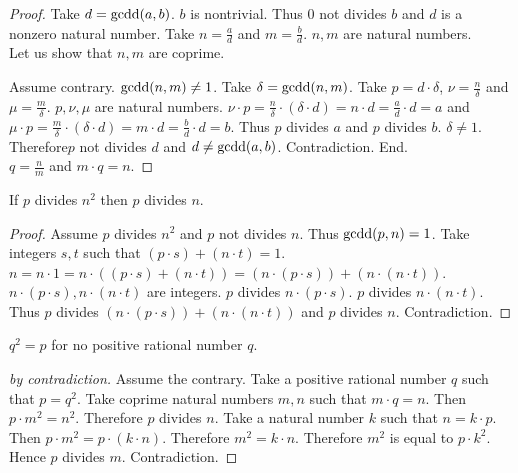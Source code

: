 \documentclass{article}
\begin{document}
\begin{forthel}
\begin{proof}
Take $d = \text{gcdd}(a,b)$. $b$ is nontrivial. Thus 0 not divides $b$ and $d$ is a nonzero natural number. 
Take $n = \frac{a}{d}$ and $m = \frac{b}{d}$. $n,m$ are natural numbers.\\

Let us show that $n,m$ are coprime. 

  Assume contrary. $\text{gcdd}(n,m) \neq 1$. Take $\delta = \text{gcdd}(n,m)$.
  Take $p = d \cdot \delta$, $\nu = \frac{n}{\delta}$ and $\mu = \frac{m}{\delta}$. $p,\nu,\mu$ are natural numbers.
  $\nu \cdot p = \frac{n}{\delta} \cdot (\delta \cdot d) = n \cdot d = \frac{a}{d} \cdot d = a$ and
  $\mu \cdot p = \frac{m}{\delta} \cdot (\delta \cdot d) = m \cdot d = \frac{b}{d} \cdot d = b$. 
  Thus $p$ divides $a$ and $p$ divides $b$. $\delta \neq 1$.
  Therefore$p$ not divides $d$ and $d \neq \text{gcdd}(a,b)$. Contradiction.
End.\\

$q = \frac{n}{m}$ and $m \cdot q = n$.
\end{proof}

    \begin{lemma}
      If $p$ divides $n^{2}$ then $p$ divides $n$. 
    \end{lemma}
    \begin{proof}
      Assume $p$ divides $n^{2}$ and $p$ not divides $n$. Thus $\text{gcdd}(p,n) = 1$.
      Take integers $s,t$ such that $(p \cdot s) + (n \cdot t) = 1$.
      $n = n \cdot 1 = n \cdot ((p \cdot s) + (n \cdot t)) = (n \cdot (p \cdot s)) + (n \cdot (n \cdot t))$.
      $n \cdot (p \cdot s), n \cdot (n \cdot t)$ are integers.
      $p$ divides $n \cdot (p \cdot s)$. $p$ divides $n \cdot (n \cdot t)$.
      Thus $p$ divides $(n \cdot (p \cdot s)) + (n \cdot (n \cdot t))$ and $p$ divides $n$. Contradiction.
    \end{proof}


    \begin{proposition}
      $q^{2} = p$ for no positive rational number $q$.
    \end{proposition}
    \begin{proof}[by contradiction]
      Assume the contrary.
      Take a positive rational number $q$ such that $p = q^{2}$.
      Take coprime natural numbers $m,n$ such that $m \cdot q = n$.
      Then $p \cdot m^{2} = n^{2}$.
      Therefore $p$ divides $n$.
      Take a natural number $k$ such that $n = k \cdot p$.
      Then $p \cdot m^{2} = p \cdot (k \cdot n)$.
      Therefore $m^{2} = k \cdot n$.
      Therefore $m^{2}$ is equal to $p \cdot k^{2}$.
      Hence $p$ divides $m$.
      Contradiction.
    \end{proof}
  \end{forthel}
\end{document}
